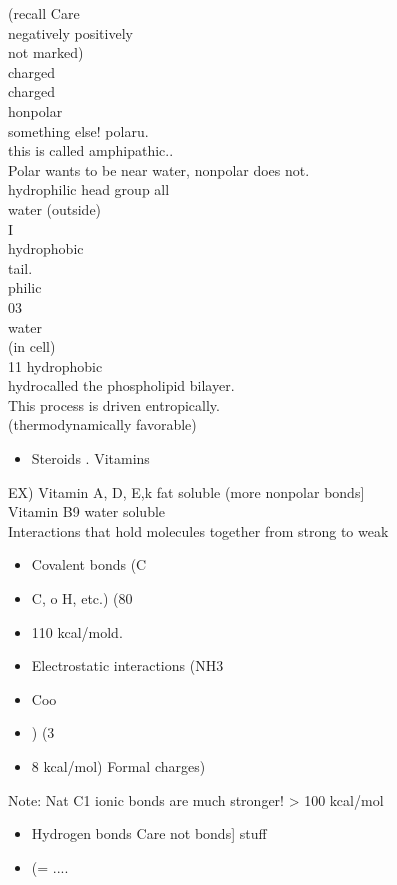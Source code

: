 \documentclass{article}
\begin{document}
(recall Care\\
negatively positively\\
not marked)\\
charged\\
charged\\
honpolar\\
something else! polaru.\\
this is called amphipathic..\\
Polar wants to be near water, nonpolar does not.\\
hydrophilic head group all\\
water (outside)\\
I\\
hydrophobic\\
tail.\\
philic\\
03\\
water\\
(in cell)\\
11 hydrophobic\\
hydrocalled the phospholipid bilayer.\\
This process is driven entropically.\\
(thermodynamically favorable)\\
\begin{itemize}\item Steroids
. Vitamins
\end{itemize}
EX) Vitamin A, D, E,k fat soluble (more nonpolar bonds{]}\\
Vitamin B9 water soluble\\
Interactions that hold molecules together from strong to weak\\
\begin{itemize}\item  Covalent bonds (C\item C, o H, etc.) (80\item 110 kcal/mold.
\item  Electrostatic interactions (NH3 \item  Coo\item ) (3\item 8 kcal/mol) Formal charges)
\end{itemize}
Note: Nat C1 ionic bonds are much stronger! > 100 kcal/mol\\
\begin{itemize}\item  Hydrogen bonds Care not bonds{]}
stuff \item  (= ....
\end{itemize}
\end{document}

